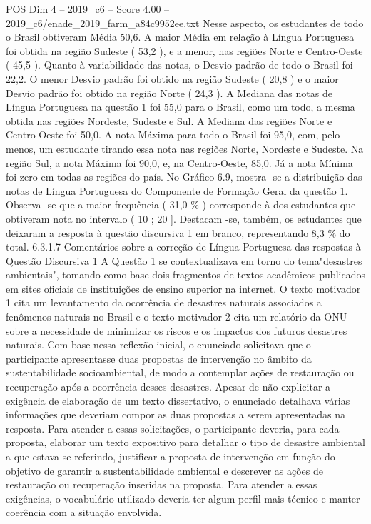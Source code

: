 \begin{textsample}{POS Dim 4 – 2019\_c6 – Score 4.00 – 2019\_c6/enade\_2019\_farm\_a84c9952ee.txt}
Nesse aspecto, os estudantes de todo o Brasil obtiveram Média 50,6.
A maior Média em relação à Língua Portuguesa foi obtida na região Sudeste ( 53,2 ), e a menor, nas regiões Norte e Centro-Oeste ( 45,5 ).
Quanto à variabilidade das notas, o Desvio padrão de todo o Brasil foi 22,2.
O menor Desvio padrão foi obtido na região Sudeste ( 20,8 ) e o maior Desvio padrão foi obtido na região Norte ( 24,3 ).
A Mediana das notas de Língua Portuguesa na questão 1 foi 55,0 para o Brasil, como um todo, a mesma obtida nas regiões Nordeste, Sudeste e Sul.
A Mediana das regiões Norte e Centro-Oeste foi 50,0.
A nota Máxima para todo o Brasil foi 95,0, com, pelo menos, um estudante tirando essa nota nas regiões Norte, Nordeste e Sudeste.
Na região Sul, a nota Máxima foi 90,0, e, na Centro-Oeste, 85,0.
Já a nota Mínima foi zero em todas as regiões do país.
No Gráfico 6.9, mostra -se a distribuição das notas de Língua Portuguesa do Componente de Formação Geral da questão 1.
Observa -se que a maior frequência ( 31,0 \% ) corresponde à dos estudantes que obtiveram nota no intervalo ( 10 ; 20 ].
Destacam -se, também, os estudantes que deixaram a resposta à questão discursiva 1 em branco, representando 8,3 \% do total. 6.3.1.7 Comentários sobre a correção de Língua Portuguesa das respostas à Questão Discursiva 1 A Questão 1 se contextualizava em torno do tema"desastres ambientais", tomando como base dois fragmentos de textos acadêmicos publicados em sites oficiais de instituições de ensino superior na internet.
O texto motivador 1 cita um levantamento da ocorrência de desastres naturais associados a fenômenos naturais no Brasil e o texto motivador 2 cita um relatório da ONU sobre a necessidade de minimizar os riscos e os impactos dos futuros desastres naturais.
Com base nessa reflexão inicial, o enunciado solicitava que o participante apresentasse duas propostas de intervenção no âmbito da sustentabilidade socioambiental, de modo a contemplar ações de restauração ou recuperação após a ocorrência desses desastres.
Apesar de não explicitar a exigência de elaboração de um texto dissertativo, o enunciado detalhava várias informações que deveriam compor as duas propostas a serem apresentadas na resposta.
Para atender a essas solicitações, o participante deveria, para cada proposta, elaborar um texto expositivo para detalhar o tipo de desastre ambiental a que estava se referindo, justificar a proposta de intervenção em função do objetivo de garantir a sustentabilidade ambiental e descrever as ações de restauração ou recuperação inseridas na proposta.
Para atender a essas exigências, o vocabulário utilizado deveria ter algum perfil mais técnico e manter coerência com a situação envolvida.

\end{textsample}
